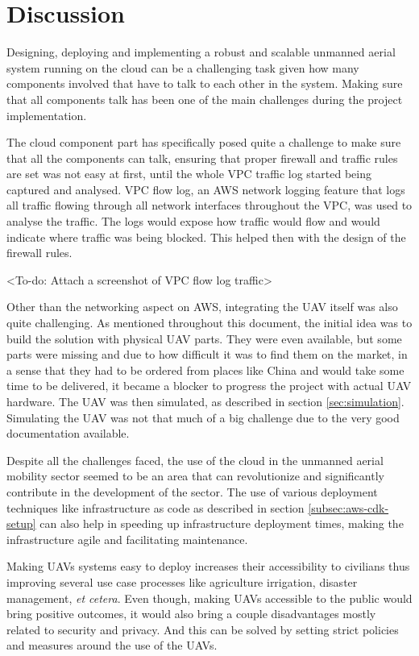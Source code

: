 
\chapter{Discussion}
\label{chap:discussion}

Designing, deploying and implementing a robust and scalable unmanned aerial system running on the cloud can be a challenging task given how many components involved that have to talk to each other in the system. Making sure that all components talk has been one of the main challenges during the project implementation.

The cloud component part has specifically posed quite a challenge to make sure that all the components can talk, ensuring that proper firewall and traffic rules are set was not easy at first, until the whole VPC traffic log started being captured and analysed. VPC flow log, an AWS network logging feature that logs all traffic flowing through all network interfaces throughout the VPC, was used to analyse the traffic. The logs would expose how traffic would flow and would indicate where traffic was being blocked. This helped then with the design of the firewall rules.

<To-do: Attach a screenshot of VPC flow log traffic>

Other than the networking aspect on AWS, integrating the UAV itself  was also quite challenging. As mentioned throughout this document, the initial idea was to build the solution with physical UAV parts. They were even available, but some parts were missing and due to how difficult it was to find them on the market, in a sense that they had to be ordered from places like China and would take some time to be delivered, it became a blocker to progress the project with actual UAV hardware. The UAV was then simulated, as described in section \ref{sec:simulation}. Simulating the UAV was not that much of a big challenge due to the very good documentation available.

Despite all the challenges faced, the use of the cloud in the unmanned aerial mobility sector seemed to be an area that can revolutionize and significantly contribute in the development of the sector. The use of various deployment techniques like infrastructure as code as described in section \ref{subsec:aws-cdk-setup} can also help in speeding up infrastructure deployment times, making the infrastructure agile and facilitating maintenance.

Making UAVs systems easy to deploy increases their accessibility to civilians thus improving several use case processes like agriculture irrigation, disaster management, \textit{et cetera}. Even though, making UAVs accessible to the public would bring positive outcomes, it would also bring a couple disadvantages mostly related to security and privacy. And this can be solved by setting strict policies and measures around the use of the UAVs.